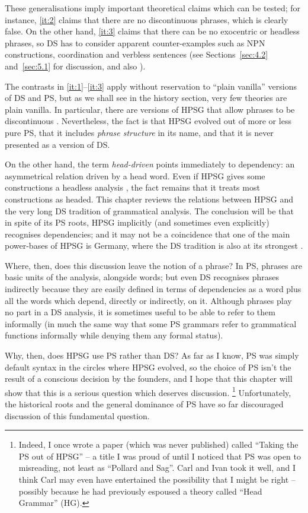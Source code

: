 \documentclass[output=paper
	        ,collection
	        ,collectionchapter
 	        ,biblatex
                ,babelshorthands
                ,newtxmath
                ,draftmode
                ,colorlinks, citecolor=brown
]{langscibook}
\begin{document}
These generalisations imply important theoretical claims which can be tested; for instance, \ref{it:2} claims that there are no discontinuous phrases, which is clearly false. On the other hand, \ref{it:3} claims that there can be no exocentric or headless phrases, so DS has to consider apparent counter-examples such as NPN constructions, coordination and verbless sentences (see Sections~\ref{sec:4.2} and~\ref{sec:5.1} for discussion, and also ).

The contrasts in \ref{it:1}--\ref{it:3} apply without reservation to ``plain vanilla'' \citep{Zwicky1985} versions of DS and PS, but as we shall see in the history section, very few theories are plain vanilla. In particular, there are versions of HPSG that allow phrases to be discontinuous \citep{Reape94a,Kathol2000a,Mueller95c,Babel}. Nevertheless, the fact is that HPSG evolved out of more or less pure PS, that it includes \emph{phrase structure} in its name, and that it is never presented as a version of DS.

On the other hand, the term \emph{head-driven} points immediately to dependency: an asymmetrical relation driven by a head word. Even if HPSG gives some constructions a headless analysis \citep[654--666]{MuellerGT-Eng2}, the fact remains that it treats most constructions as headed.
This chapter reviews the relations between HPSG and the very long DS tradition of grammatical analysis. The conclusion will be that in spite of its PS roots, HPSG implicitly (and sometimes even explicitly) recognises dependencies; and it may not be a coincidence that one of the main power-bases of HPSG is Germany, where the DS tradition is also at its strongest  \citep[359]{MuellerGT-Eng2}.

Where, then, does this discussion leave the notion of a phrase? In PS, phrases are basic units of the analysis, alongside words; but even DS recognises phrases indirectly because they are easily defined in terms of dependencies as a word plus all the words which depend, directly or indirectly, on it. Although phrases play no part in a DS analysis, it is sometimes useful to be able to refer to them informally (in much the same way that some PS grammars refer to grammatical functions informally while denying them any formal status).

Why, then, does HPSG use PS rather than DS? As far as I know, PS was simply default syntax in the circles where HPSG evolved, so the choice of PS isn’t the result of a conscious decision by the founders, and I hope that this chapter will show that this is a serious question which deserves discussion.%
%
\footnote{Indeed, I once wrote a paper (which was never published) called ``Taking the PS out of HPSG'' – a title I was proud of until I noticed that PS was open to misreading, not least as ``Pollard and Sag''. Carl and Ivan took it well, and I think Carl may even have entertained the possibility that I might be right – possibly because he had previously espoused a theory called ``Head Grammar'' (HG).}%
%
Unfortunately, the historical roots and the general dominance of PS have so far discouraged discussion of this fundamental question.
\end{document}
